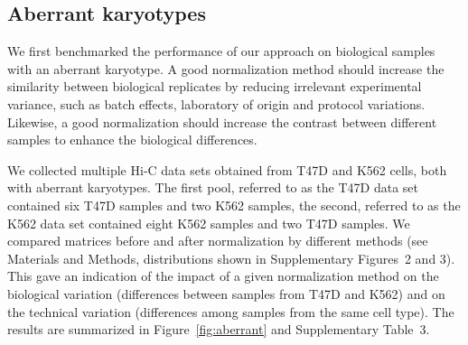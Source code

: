 \documentclass[a4,center,fleqn]{NAR}
\begin{document}
%
%
%



\subsection{Aberrant karyotypes}

We first benchmarked the performance of our approach on biological
samples with an aberrant karyotype. A good normalization method should
increase the similarity between biological replicates by reducing
irrelevant experimental variance, such as batch effects, laboratory of
origin and protocol variations. Likewise, a good normalization should
increase the contrast between different samples to enhance the
biological differences.

We collected multiple Hi-C data sets obtained from T47D and K562 cells,
both with aberrant karyotypes. The first pool, referred to as the T47D data
set contained six T47D samples and two K562 samples, the second, referred
to as the K562 data set contained eight K562 samples and two T47D samples.
We compared matrices before and after normalization by different methods
(see Materials and Methods, distributions shown in Supplementary Figures~2
and 3). This gave an indication of the impact of a given normalization
method on the biological variation (differences between samples from T47D
and K562) and on the technical variation (differences among samples from
the same cell type). The results are summarized in
Figure~\ref{fig:aberrant} and Supplementary Table~3.
\end{document}
